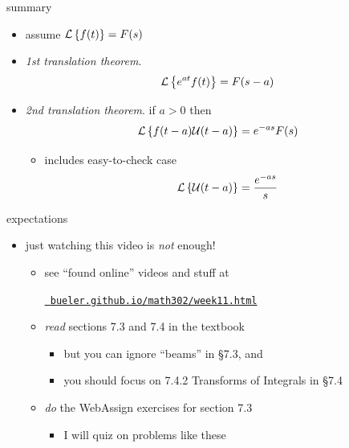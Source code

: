 \documentclass[urlcolor=blue,dvipsnames]{beamer}
\begin{document}
\begin{frame}{summary}

\begin{itemize}
\item assume $\mathcal{L}\left\{f(t)\right\}=F(s)$
\item \emph{1st translation theorem}.
    $$\mathcal{L}\left\{e^{at} f(t)\right\} = F(s-a)$$
\item \emph{2nd translation theorem}.  if $a>0$ then
    $$\mathcal{L}\left\{f(t-a) \mathcal{U}(t-a)\right\} = e^{-as} F(s)$$

\vspace{-2mm}
    \begin{itemize}
    \item includes easy-to-check case
    $$\mathcal{L}\left\{\mathcal{U}(t-a)\right\} = \frac{e^{-as}}{s}$$
    \end{itemize}
\end{itemize}
\end{frame}


\begin{frame}{expectations}

\begin{itemize}
\item just watching this video is \emph{not} enough!
     \begin{itemize}
     \item see ``found online'' videos and stuff at

     \centerline{\href{https://bueler.github.io/math302/week11.html}{\tt \color{cyan} bueler.github.io/math302/week11.html}}
     \item \emph{read} sections 7.3 and 7.4 in the textbook
         \begin{itemize}
         \item but you can ignore ``beams'' in \S7.3, and
         \item you should focus on 7.4.2 Transforms of Integrals in \S7.4
         \end{itemize}
     \item \emph{do} the WebAssign exercises for section 7.3
         \begin{itemize}
         \item I will quiz on problems like these
         \end{itemize}
     \end{itemize}
\end{itemize}
\end{frame}
\end{document}
